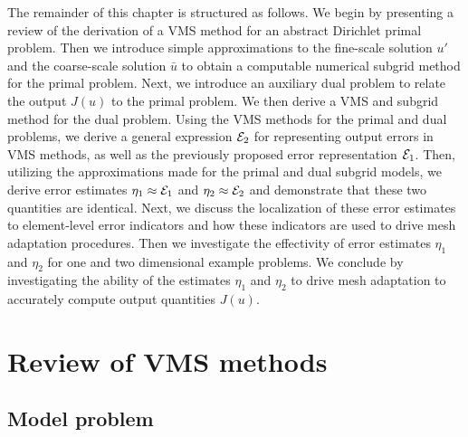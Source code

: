 The remainder of this chapter is structured as follows.
We begin by presenting a review of the derivation
of a VMS method for an abstract Dirichlet primal problem.
Then we introduce simple approximations to the fine-scale
solution $u'$ and the coarse-scale solution $\bar{u}$
to obtain a computable numerical subgrid method for
the primal problem. Next, we introduce an auxiliary
dual problem to relate the output $J(u)$ to the primal
problem. We then derive a VMS and subgrid method for the
dual problem. Using the VMS methods for the primal and
dual problems, we derive a general expression $\mathcal{E}_2$ for
representing output errors in VMS methods, as well as
the previously proposed error representation $\mathcal{E}_1$.
Then, utilizing the approximations made for the primal
and dual subgrid models, we derive error estimates
$\eta_1 \approx \mathcal{E}_1$ and $\eta_2 \approx \mathcal{E}_2$
and demonstrate that these two quantities are identical.
Next, we discuss the localization of these error estimates
to element-level error indicators and how these indicators
are used to drive mesh adaptation procedures. Then we
investigate the effectivity of
error estimates $\eta_1$ and $\eta_2$ for one and
two dimensional example problems. We conclude by
investigating the ability of the estimates $\eta_1$
and $\eta_2$ to drive mesh adaptation to accurately
compute output quantities $J(u)$.

\section{Review of VMS methods}

\subsection{Model problem}

